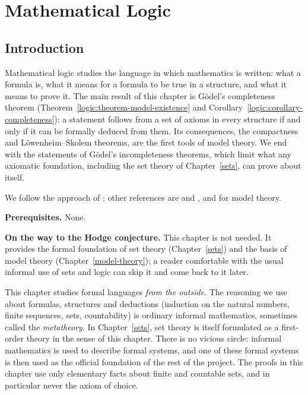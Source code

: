 \chapter{Mathematical Logic}\label{logic}

\section{Introduction}\label{logic:section-introduction}

Mathematical logic studies the language in which mathematics is written: what
a formula is, what it means for a formula to be true in a structure, and what
it means to prove it. The main result of this chapter is G\"odel's completeness
theorem (Theorem~\ref{logic:theorem-model-existence} and
Corollary~\ref{logic:corollary-completeness}): a statement follows from a set
of axioms in every structure if and only if it can be formally deduced from
them. Its consequences, the compactness and L\"owenheim--Skolem theorems, are
the first tools of model theory. We end with the statements of G\"odel's
incompleteness theorems, which limit what any axiomatic foundation, including
the set theory of Chapter~\ref{sets}, can prove about itself.

We follow the approach of \cite{enderton-logic}; other references are
\cite{shoenfield-logic} and \cite{vandalen-logic}, and \cite{chang-keisler} for
model theory.

\noindent\textbf{Prerequisites.} None.

\noindent\textbf{On the way to the Hodge conjecture.} This chapter is not needed. It provides the formal foundation of set theory (Chapter~\ref{sets}) and the basis of model theory (Chapter~\ref{model-theory});
a reader comfortable with the usual informal use of sets and logic can skip it and come back to it later.

\begin{remark}\label{logic:remark-metatheory}
This chapter studies formal languages \emph{from the outside}. The reasoning
we use about formulas, structures and deductions (induction on the natural
numbers, finite sequences, sets, countability) is ordinary informal
mathematics, sometimes called the \emph{metatheory}. In
Chapter~\ref{sets}, set theory is itself formulated as a first-order theory
in the sense of this chapter. There is no vicious circle: informal
mathematics is used to describe formal systems, and one of these formal
systems is then used as the official foundation of the rest of the project.
The proofs in this chapter use only elementary facts about finite and
countable sets, and in particular never the axiom of choice.
\end{remark}

